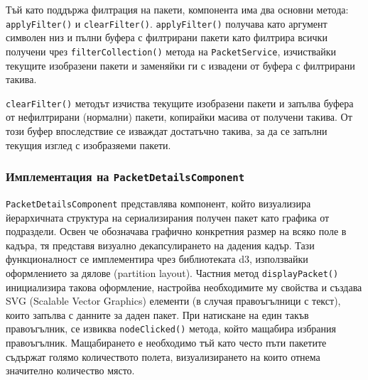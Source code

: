 \documentclass[12pt,a4paper,oneside]{book}
\begin{document}


Тъй като поддържа филтрация на пакети, компонента има два основни метода:
\texttt{applyFilter()} и \texttt{clearFilter()}. \texttt{applyFilter()} получава
като аргумент символен низ и пълни буфера с филтрирани пакети като филтрира
всички получени чрез \texttt{filterCollection()} метода на
\texttt{PacketService}, изчиствайки текущите изобразени пакети и заменяйки ги с
извадени от буфера с филтрирани такива.



\texttt{clearFilter()} методът изчиства текущите изобразени пакети и запълва
буфера от нефилтрирани (нормални) пакети, копирайки масива от получени такива.
От този буфер впоследствие се изваждат достатъчно такива, за да се запълни
текущия изглед с изобразяеми пакети.



\subsubsection{Имплементация на \texttt{PacketDetailsComponent}}

\texttt{PacketDetailsComponent} представлява компонент, който визуализира
йерархичната структура на сериализирания получен пакет като графика от
подраздели. Освен че обозначава графично конкретния размер на всяко поле в
кадъра, тя представя визуално декапсулирането на дадения кадър. Тази
функционалност се имплементира чрез библиотеката d3, използвайки оформлението
за дялове (partition layout). Частния метод \texttt{displayPacket()} инициализира
такова оформление, настройва необходимите му свойства и създава SVG (Scalable
Vector Graphics) елементи (в случая правоъгълници с текст), които запълва с
данните за даден пакет.
При натискане на един такъв правоъгълник, се
извиква \texttt{nodeClicked()} метода, който мащабира избрания правоъгълник.
Мащабирането е необходимо тъй като често пъти пакетите съдържат голямо
количеството полета, визуализирането на които отнема значително количество
място.
\end{document}
